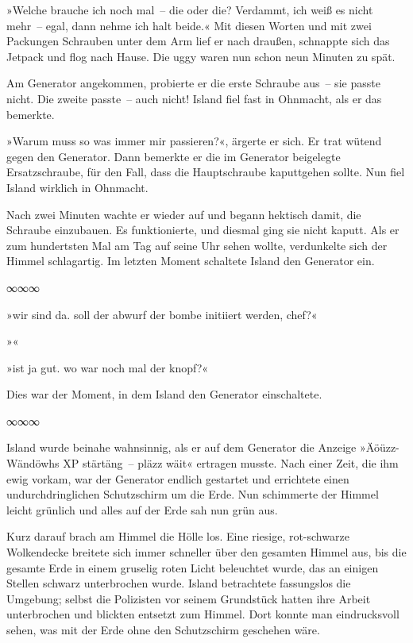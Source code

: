 »Welche brauche ich noch mal~– die oder die? Verdammt, ich weiß es nicht mehr~– egal, dann nehme ich halt beide.« Mit diesen Worten und mit zwei Packungen Schrauben unter dem Arm lief er nach draußen, schnappte sich das Jetpack und flog nach Hause. Die uggy waren nun schon neun Minuten zu spät.

Am Generator angekommen, probierte er die erste Schraube aus~– sie passte nicht. Die zweite passte~– auch nicht! Island fiel fast in Ohnmacht, als er das bemerkte.

»Warum muss so was immer mir passieren?«, ärgerte er sich. Er trat wütend gegen den Generator. Dann bemerkte er die im Generator beigelegte Ersatzschraube, für den Fall, dass die Hauptschraube kaputtgehen sollte. Nun fiel Island wirklich in Ohnmacht.

Nach zwei Minuten wachte er wieder auf und begann hektisch damit, die Schraube einzubauen. Es funktionierte, und diesmal ging sie nicht kaputt. Als er zum hundertsten Mal am Tag auf seine Uhr sehen wollte, verdunkelte sich der Himmel schlagartig. Im letzten Moment schaltete Island den Generator ein.

\begin{center}
    ∞∞∞
\end{center}

»wir sind da. soll der abwurf der bombe initiiert werden, chef?«

»«

»ist ja gut. wo war noch mal der knopf?«

Dies war der Moment, in dem Island den Generator einschaltete.

\begin{center}
    ∞∞∞
\end{center}

Island wurde beinahe wahnsinnig, als er auf dem Generator die Anzeige »Äöüzz-Wändöwhs XP stärtäng~– pläzz wäit« ertragen musste. Nach einer Zeit, die ihm ewig vorkam, war der Generator endlich gestartet und errichtete einen undurchdringlichen Schutzschirm um die Erde. Nun schimmerte der Himmel leicht grünlich und alles auf der Erde sah nun grün aus.

Kurz darauf brach am Himmel die Hölle los. Eine riesige, rot-schwarze Wolkendecke breitete sich immer schneller über den gesamten Himmel aus, bis die gesamte Erde in einem gruselig roten Licht beleuchtet wurde, das an einigen Stellen schwarz unterbrochen wurde. Island betrachtete fassungslos die Umgebung; selbst die Polizisten vor seinem Grundstück hatten ihre Arbeit unterbrochen und blickten entsetzt zum Himmel. Dort konnte man eindrucksvoll sehen, was mit der Erde ohne den Schutzschirm geschehen wäre.

